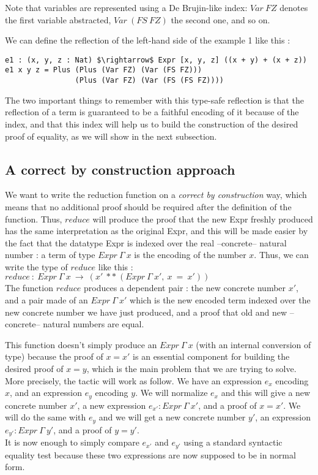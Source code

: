 Note that variables are represented using a De Brujin-like index: $Var\:FZ$
denotes the first variable abstracted, $Var\:(FS\:FZ)$ the second one, and so
on.

We can define the reflection of the left-hand side of the example 1 like this :
\begin{lstlisting}
e1 : (x, y, z : Nat) $\rightarrow$ Expr [x, y, z] ((x + y) + (x + z))
e1 x y z = Plus (Plus (Var FZ) (Var (FS FZ))) 
                (Plus (Var FZ) (Var (FS (FS FZ))))
\end{lstlisting}

The two important things to remember with this type-safe reflection is that the reflection of a term is guaranteed to be a faithful encoding of it because of the index, and that this index will help us to build the construction of the desired proof of equality, as we will show in the next subsection.


	\subsection{A correct by construction approach}
\label{sect:aCorrectByConstructionApproach}

We want to write the reduction function on a \emph{correct by construction} way, which means that no additional proof should be required after the definition of the function. Thus, $reduce$ will produce the proof that the new Expr freshly produced has the same interpretation as the original Expr, and this will be made easier by the fact that the datatype Expr is indexed over the real --concrete-- natural number : a term of type $Expr\ \Gamma\ x$ is the encoding of the number $x$.
Thus, we can write the type of $reduce$ like this : \\
$reduce\ :\ Expr\ \Gamma\ x\ \rightarrow\ (x'\ **\ (Expr\ \Gamma\ x',\ x\ =\ x'))$ \\
The function $reduce$ produces a dependent pair : the new concrete number $x'$, and a pair made of an $Expr\ \Gamma\ x'$ which is the new encoded term indexed over the new concrete number we have just produced, and a proof that old and new --concrete-- natural numbers are equal.

This function doesn't simply produce an $Expr\ \Gamma\ x$ (with an internal conversion of type) because the proof of $x=x'$ is an essential component for building the desired proof of $x=y$, which is the main problem that we are trying to solve. More precisely, the tactic will work as follow.
We have an expression $e_x$ encoding $x$, and an expression $e_y$ encoding $y$. We will normalize $e_x$ and this will give a new concrete number $x'$, a new expression $e_{x'}:Expr\ \Gamma\ x'$, and a proof of $x=x'$. We will do the same with $e_y$ and we will get a new concrete number $y'$, an expression $e_{y'}:Expr\ \Gamma\ y'$, and a proof of $y=y'$. \\
It is now enough to simply compare $e_{x'}$ and $e_{y'}$ using a standard syntactic equality test because these two expressions are now supposed to be in normal form.


